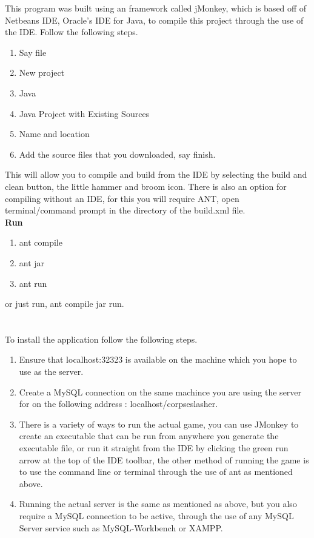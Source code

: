\documentclass[letterpaper]{article}
\begin{document}
		This program was built using an framework called jMonkey, which is based off of Netbeans IDE, Oracle's IDE for Java, to compile this project through the use of the IDE. Follow the following steps.
		\begin{enumerate}
		
		\item Say file 
		\item New project
		\item Java 
		\item Java Project with Existing Sources 
		\item Name and location
		\item Add the source files that you downloaded, say finish.
		
		\end{enumerate} 
		This will allow you to compile and build from the IDE by selecting the build and clean button, the little hammer and broom icon. There is also an option for compiling without an IDE, for this you will require ANT, open terminal/command prompt in the directory of the build.xml file.\\ \textbf{Run}
	\begin{enumerate}
	\item ant compile
	\item ant jar
	\item ant run
\end{enumerate}	 
or just run, ant compile jar run.
		
		\section*{\colorbox{black}{}} 
	\vspace{0.1in}
	
	To install the application follow the following steps.
	\begin{enumerate}
		\item Ensure that localhost:32323 is available on the machine which you hope to use as the server.
		\item Create a MySQL connection on the same machince you are using the server for on the following address : localhost/corpseslasher.
		\item There is a variety of ways to run the actual game, you can use JMonkey to create an executable that can be run from anywhere you generate the executable file, or run it straight from the IDE by clicking the green run arrow at the top of the IDE toolbar, the other method of running the game is to use the command line or terminal through the use of ant as mentioned above.
		\item Running the actual server is the same as mentioned as above, but you also require a MySQL connection to be active, through the use of any MySQL Server service such as MySQL-Workbench or XAMPP.
	\end{enumerate}
	\newpage
\end{document}
